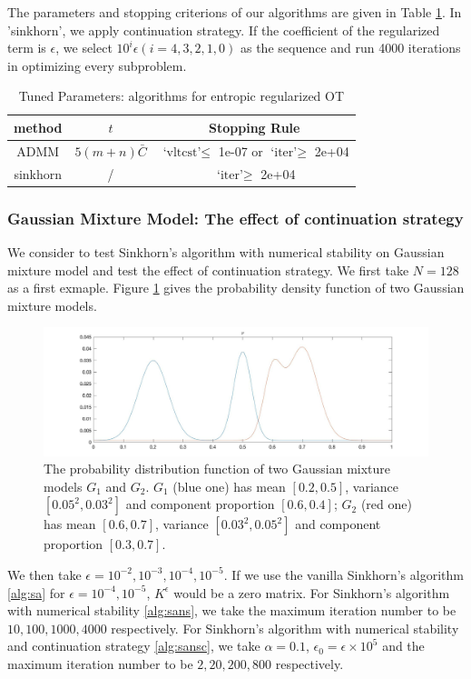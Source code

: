 The parameters and stopping criterions of our algorithms are given in Table \ref{param_er}. In 'sinkhorn', we apply continuation strategy. If the coefficient of the regularized term is $\epsilon$, we select $10^i\epsilon(i=4, 3, 2, 1, 0)$ as the sequence and run 4000 iterations in optimizing every subproblem.

\begin{table}[htbp]
\centering
\caption{Tuned Parameters: algorithms for entropic regularized OT}
\label{param_er}
\begin{tabular}{|c|c|c|}
\hline 
method & $t$ & Stopping Rule \\
\hline
ADMM & $5(m+n)\bar C$ & $\text{`vltcst'}\leqslant$ 1e-07 or $\text{`iter'}\geqslant$ 2e+04 \\\hline
sinkhorn & / & $\text{`iter'}\geqslant$ 2e+04 \\
\hline
\end{tabular}
\end{table}

\subsubsection{Gaussian Mixture Model: The effect of continuation strategy}

We consider to test Sinkhorn's algorithm with numerical stability on Gaussian mixture model and test the effect of continuation strategy. We first take $N=128$ as a first exmaple. Figure \ref{gmm3} gives the probability density function of two Gaussian mixture models.
\begin{figure}[htbp]
\centering
\includegraphics[width=12cm]{final/gmm3.jpg}
\caption{The probability distribution function of two Gaussian mixture models $G_1$ and $G_2$. $G_1$ (blue one) has mean $[0.2,0.5]$, variance $[0.05^2, 0.03^2]$ and component proportion $[0.6, 0.4]$; $G_2$ (red one) has mean $[0.6,0.7]$, variance $[0.03^2, 0.05^2]$ and component proportion $[0.3, 0.7]$. }
\label{gmm3}
\end{figure}

We then take $\epsilon=10^{-2},10^{-3},10^{-4},10^{-5}$. If we use the vanilla Sinkhorn's algorithm \ref{alg:sa} for $\epsilon=10^{-4},10^{-5}$, $K^{\epsilon}$ would be a zero matrix. For Sinkhorn's algorithm with numerical stability \ref{alg:sans}, we take the maximum iteration number to be $10,100,1000,4000$ respectively. For Sinkhorn's algorithm with numerical stability and continuation strategy \ref{alg:sansc}, we take $\alpha=0.1$, $\epsilon_0=\epsilon\times 10^5$ and the maximum iteration number to be $2,20,200,800$ respectively. 

